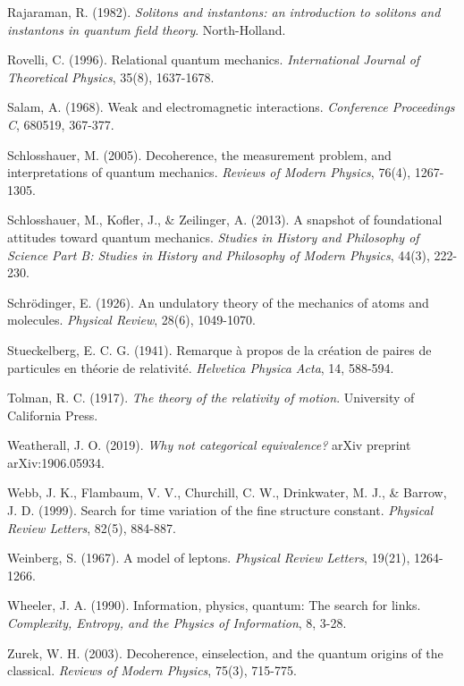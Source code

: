 \documentclass[a4paper,12pt]{article}
\begin{document}
\begin{thebibliography}{99}
		 Rajaraman, R. (1982). \textit{Solitons and instantons: an introduction to solitons and instantons in quantum field theory}. North-Holland.
		
		 Rovelli, C. (1996). Relational quantum mechanics. \textit{International Journal of Theoretical Physics}, 35(8), 1637-1678.
		
		 Salam, A. (1968). Weak and electromagnetic interactions. \textit{Conference Proceedings C}, 680519, 367-377.
		
		 Schlosshauer, M. (2005). Decoherence, the measurement problem, and interpretations of quantum mechanics. \textit{Reviews of Modern Physics}, 76(4), 1267-1305.
		
		 Schlosshauer, M., Kofler, J., \& Zeilinger, A. (2013). A snapshot of foundational attitudes toward quantum mechanics. \textit{Studies in History and Philosophy of Science Part B: Studies in History and Philosophy of Modern Physics}, 44(3), 222-230.
		
		 Schrödinger, E. (1926). An undulatory theory of the mechanics of atoms and molecules. \textit{Physical Review}, 28(6), 1049-1070.
		
		 Stueckelberg, E. C. G. (1941). Remarque à propos de la création de paires de particules en théorie de relativité. \textit{Helvetica Physica Acta}, 14, 588-594.
		
		 Tolman, R. C. (1917). \textit{The theory of the relativity of motion}. University of California Press.
		
		 Weatherall, J. O. (2019). \textit{Why not categorical equivalence?} arXiv preprint arXiv:1906.05934.
		
		 Webb, J. K., Flambaum, V. V., Churchill, C. W., Drinkwater, M. J., \& Barrow, J. D. (1999). Search for time variation of the fine structure constant. \textit{Physical Review Letters}, 82(5), 884-887.
		
		 Weinberg, S. (1967). A model of leptons. \textit{Physical Review Letters}, 19(21), 1264-1266.
		
		 Wheeler, J. A. (1990). Information, physics, quantum: The search for links. \textit{Complexity, Entropy, and the Physics of Information}, 8, 3-28.
		
		 Zurek, W. H. (2003). Decoherence, einselection, and the quantum origins of the classical. \textit{Reviews of Modern Physics}, 75(3), 715-775.
	\end{thebibliography}
	
\end{document}

